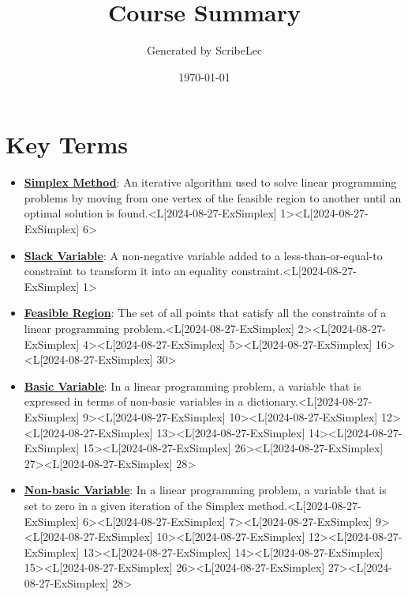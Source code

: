 \documentclass{article}%
\title{Course Summary}%
\author{Generated by ScribeLec}%
\date{\today}%
\begin{document}
%
\normalsize%
\maketitle%
\tableofcontents\newpage%
\section{Key Terms}%
\label{sec:KeyTerms}%
\begin{itemize}[[leftmargin=*]]%
\item \href{https://www.math.purdue.edu/~yipn/421/2024-08-27-ExSimplex.pdf#page=1}{\textbf{Simplex Method}}: An iterative algorithm used to solve linear programming problems by moving from one vertex of the feasible region to another until an optimal solution is found.<L[2024-08-27-ExSimplex] 1><L[2024-08-27-ExSimplex] 6>%
\item \href{https://www.math.purdue.edu/~yipn/421/2024-08-27-ExSimplex.pdf#page=1}{\textbf{Slack Variable}}: A non-negative variable added to a less-than-or-equal-to constraint to transform it into an equality constraint.<L[2024-08-27-ExSimplex] 1>%
\item \href{https://www.math.purdue.edu/~yipn/421/2024-08-27-ExSimplex.pdf#page=2}{\textbf{Feasible Region}}: The set of all points that satisfy all the constraints of a linear programming problem.<L[2024-08-27-ExSimplex] 2><L[2024-08-27-ExSimplex] 4><L[2024-08-27-ExSimplex] 5><L[2024-08-27-ExSimplex] 16><L[2024-08-27-ExSimplex] 30>%
\item \href{https://www.math.purdue.edu/~yipn/421/2024-08-27-ExSimplex.pdf#page=9}{\textbf{Basic Variable}}: In a linear programming problem, a variable that is expressed in terms of non-basic variables in a dictionary.<L[2024-08-27-ExSimplex] 9><L[2024-08-27-ExSimplex] 10><L[2024-08-27-ExSimplex] 12><L[2024-08-27-ExSimplex] 13><L[2024-08-27-ExSimplex] 14><L[2024-08-27-ExSimplex] 15><L[2024-08-27-ExSimplex] 26><L[2024-08-27-ExSimplex] 27><L[2024-08-27-ExSimplex] 28>%
\item \href{https://www.math.purdue.edu/~yipn/421/2024-08-27-ExSimplex.pdf#page=6}{\textbf{Non{-}basic Variable}}: In a linear programming problem, a variable that is set to zero in a given iteration of the Simplex method.<L[2024-08-27-ExSimplex] 6><L[2024-08-27-ExSimplex] 7><L[2024-08-27-ExSimplex] 9><L[2024-08-27-ExSimplex] 10><L[2024-08-27-ExSimplex] 12><L[2024-08-27-ExSimplex] 13><L[2024-08-27-ExSimplex] 14><L[2024-08-27-ExSimplex] 15><L[2024-08-27-ExSimplex] 26><L[2024-08-27-ExSimplex] 27><L[2024-08-27-ExSimplex] 28>%

\end{itemize}
\end{document}
